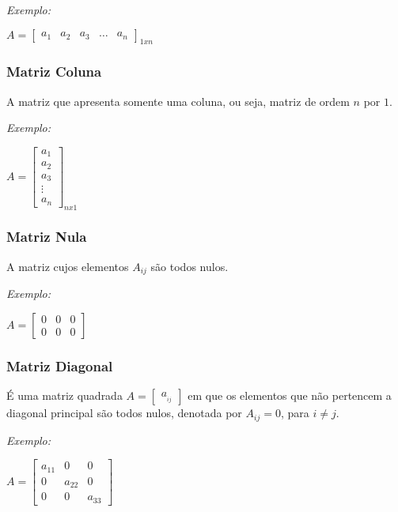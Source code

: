 \textit{Exemplo:}
\begin{center}
    $A = 
    \begin{bmatrix}
        a_{1} & a_{2} & a_{3} & \ldots & a_{n}
    \end{bmatrix}_{1 x n}$
\end{center}

\subsubsection{Matriz Coluna}
\noindent A matriz que apresenta somente uma coluna, ou seja, matriz de ordem $n$ por $1$.

\textit{Exemplo:}
\begin{center}
    $A = 
    \begin{bmatrix}
        a_{1} \\ 
        a_{2} \\
        a_{3} \\
        \vdots \\
        a_{n} 
    \end{bmatrix}_{n x 1}$
\end{center}

\subsubsection{Matriz Nula}
\noindent A matriz cujos elementos $A{}_{ij}$ são todos nulos.

\textit{Exemplo:}
\begin{center}
    $A = 
    \begin{bmatrix}
        0 & 0 & 0\\ 
        0 & 0 & 0 
    \end{bmatrix}$
\end{center}

\subsubsection{Matriz Diagonal}
\noindent É uma matriz quadrada $A = \begin{bmatrix} a_{}_{ij} \end{bmatrix}$ em que os elementos que não pertencem a diagonal principal são todos nulos, denotada por $A{}_{ij} = 0$, para $i \neq j$.

\textit{Exemplo:}
\begin{center}
    $A = 
    \begin{bmatrix}
        a_{11} & 0 & 0 \\ 
        0 & a_{22} & 0 \\ 
        0 & 0 & a_{33}  
    \end{bmatrix}$
\end{center}

